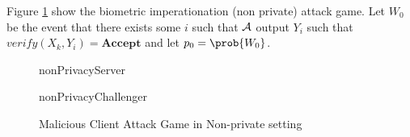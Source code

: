 \begin{description}
\begin{description}
    Figure \ref{fig:maliciousNonPrivate} show the biometric
    imperationation (non private) attack game. Let $W_{0}$ be the event that there exists some $i$ such that
    $\mathcal{A}$ output $Y_{i}$ such that
    $verify(X_{k},Y_{i}) = \mathbf{Accept}$ and let $p_{0} = \prob{W_{0}} $.
    \begin{figure}[!h]
      \begin{center}
        \begin{bbrenv}{nonPrivacyServer}
          \begin{bbrbox}[name=Adversary, minheight=2cm]
          \end{bbrbox}
          \begin{bbrchallenger}{nonPrivacyChallenger}
            \begin{bbrbox}[name=Challenger]
            \end{bbrbox}
          \end{bbrchallenger}
        \end{bbrenv}
      \end{center}
      \caption{Malicious Client Attack Game in Non-private setting}
      \label{fig:maliciousNonPrivate}
    \end{figure}

    


\end{description}
\end{description}
